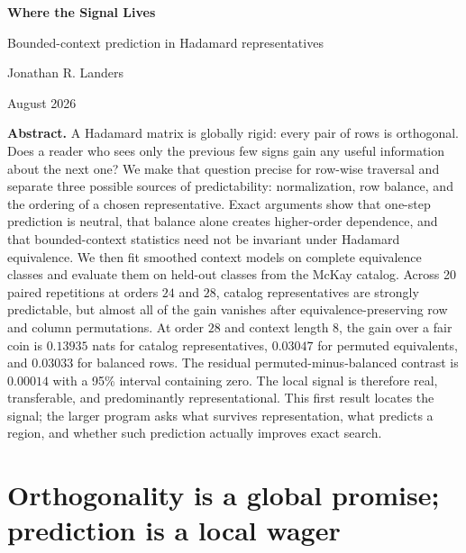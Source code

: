 \documentclass[10pt,twoside]{article}
\theoremstyle{noteplain}
\theoremstyle{definition}
\begin{document}
\begin{center}
  {\fontsize{25}{29}\selectfont\bfseries\color{MidnightBlue}Where the Signal Lives}\par\vspace{0.25em}
  {\Large Bounded-context prediction in Hadamard representatives}\par\vspace{0.85em}
  {\normalsize Jonathan R. Landers}\par\vspace{0.25em}
  {\small August 2026}
\end{center}

\vspace{0.35em}
\noindent\colorbox{Mist}{%
\begin{minipage}{0.965\linewidth}
\small
\textbf{Abstract.}
A Hadamard matrix is globally rigid: every pair of rows is orthogonal.  Does a reader who sees only the previous few signs gain any useful information about the next one?  We make that question precise for row-wise traversal and separate three possible sources of predictability: normalization, row balance, and the ordering of a chosen representative.  Exact arguments show that one-step prediction is neutral, that balance alone creates higher-order dependence, and that bounded-context statistics need not be invariant under Hadamard equivalence.  We then fit smoothed context models on complete equivalence classes and evaluate them on held-out classes from the McKay catalog.  Across 20 paired repetitions at orders $24$ and $28$, catalog representatives are strongly predictable, but almost all of the gain vanishes after equivalence-preserving row and column permutations.  At order $28$ and context length $8$, the gain over a fair coin is $0.13935$ nats for catalog representatives, $0.03047$ for permuted equivalents, and $0.03033$ for balanced rows.  The residual permuted-minus-balanced contrast is $0.00014$ with a 95\% interval containing zero.  The local signal is therefore real, transferable, and predominantly representational.  This first result locates the signal; the larger program asks what survives representation, what predicts a region, and whether such prediction actually improves exact search.
\end{minipage}}

\section{Orthogonality is a global promise; prediction is a local wager}
\end{document}

